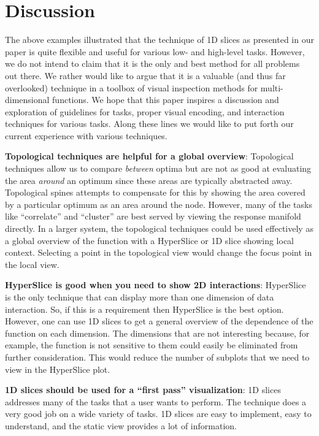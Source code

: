 
\section{Discussion}

The above examples illustrated that the technique of 1D slices as presented in
our paper is quite flexible and useful for various low- and high-level tasks.
However, we do not intend to claim that it is the only and best method for all
problems out there. We rather would like to argue that it is a valuable (and
thus far overlooked) technique in a toolbox of visual inspection methods for
multi-dimensional functions. We hope that this paper inspires a discussion and
exploration of guidelines for tasks, proper visual encoding, and interaction
techniques for various tasks. Along these lines we would like to put forth our
current experience with various techniques.

\textbf{Topological techniques are helpful for a global overview}: Topological
techniques allow us to compare \emph{between} optima but are not as good at
evaluating the area \emph{around} an optimum since these areas are typically
abstracted away.  Topological spines attempts to compensate for this by showing
the area covered by a particular optimum as an area around the node. However,
many of the tasks like ``correlate'' and ``cluster'' are best served by viewing
the response manifold directly. In a larger system, the topological techniques
could be used effectively as a global overview of the function with a
HyperSlice or 1D slice showing local context. Selecting a point in the
topological view would change the focus point in the local view.

\textbf{HyperSlice is good when you need to show 2D interactions}: HyperSlice
is the only technique that can display more than one dimension of data
interaction.  So, if this is a requirement then HyperSlice is the best option.
However, one can use 1D slices to get a general overview of the dependence of
the function on each dimension. The dimensions that are not interesting
because, for example, the function is not sensitive to them could easily be
eliminated from further consideration. This would reduce the number of subplots
that we need to view in the HyperSlice plot.

\textbf{1D slices should be used for a ``first pass'' visualization}: 1D slices
addresses many of the tasks that a user wants to perform. The technique does a
very good job on a wide variety of tasks. 1D slices are easy to
implement, easy to understand, and the static view provides a lot of
information.

